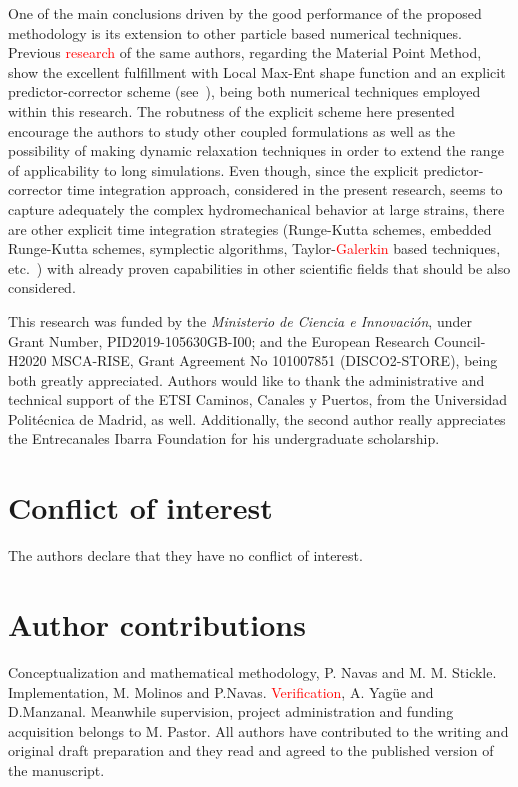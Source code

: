 \documentclass[twocolumn]{svjour3}          %
\begin{document}
One of the main conclusions driven by the good performance of the proposed methodology is its extension to other particle based numerical techniques. Previous \textcolor{red}{research} of the same authors, regarding the Material Point Method, show the excellent fulfillment with Local Max-Ent shape function and an explicit predictor-corrector scheme (see~\cite{Molinos2021,Molinos2021b}), being both numerical techniques employed within this research. The robutness of the explicit scheme here presented encourage the authors to study other coupled formulations as well as the possibility of making dynamic relaxation techniques in order to extend the range of applicability to long simulations. Even though, since the explicit predictor-corrector time integration approach, considered in the present research, seems to capture adequately the complex hydromechanical behavior at large strains, there are other explicit time integration strategies (Runge-Kutta schemes, embedded Runge-Kutta schemes, symplectic algorithms, Taylor-\textcolor{red}{Galerkin} based techniques, etc.~\cite{ODE1,BlancPastor2012,Torabi2020}) with already proven capabilities in other scientific fields that should be also considered.

\begin{acknowledgements}
This research was funded by the \textit{Ministerio de Ciencia e Innovaci\'on}, under Grant Number, PID2019-105630GB-I00; and the European
Research Council-H2020 MSCA-RISE, Grant Agreement No 101007851 (DISCO2-STORE), being both greatly appreciated. Authors would like to thank the administrative and technical support of the ETSI Caminos, Canales y Puertos, from the Universidad Polit\'ecnica de Madrid, as well. Additionally, the second author really appreciates the Entrecanales Ibarra Foundation for his undergraduate scholarship.
\end{acknowledgements}


%
\section*{Conflict of interest}
The authors declare that they have no conflict of interest.

\section*{Author contributions}
Conceptualization and mathematical methodology, P. Navas and M. M. Stickle. Implementation, M. Molinos and P.Navas. \textcolor{red}{Verification}, A. Yag\"ue and D.Manzanal. Meanwhile supervision, project administration and funding acquisition belongs to M. Pastor. All authors have contributed to the writing and original draft preparation and they read and agreed to the published version of the manuscript.
\end{document}
